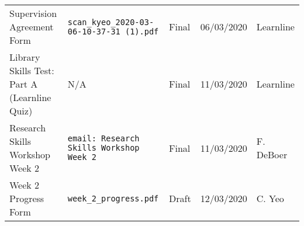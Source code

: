 \documentclass[10pt, landscape]{article}
\begin{document}
\begin{tabular}{p{7cm}p{10cm}p{1.5cm}p{2cm}p{2cm}}
	Supervision Agreement Form						& \verb|scan_kyeo_2020-03-06-10-37-31 (1).pdf|								& Final				& 06/03/2020			& Learnline\\
	
	Library Skills Test: Part A (Learnline Quiz)	& N/A																		& Final 			& 11/03/2020		 	& Learnline\\
	
	Research Skills Workshop Week 2					& \verb|email: Research Skills Workshop Week 2|								& Final				& 11/03/2020		 	& F. DeBoer\\
	
	Week 2 Progress Form							& \verb|week_2_progress.pdf|												& Draft				& 12/03/2020			& C. Yeo\\
	\bottomrule
	\end{tabular}
\end{document}
